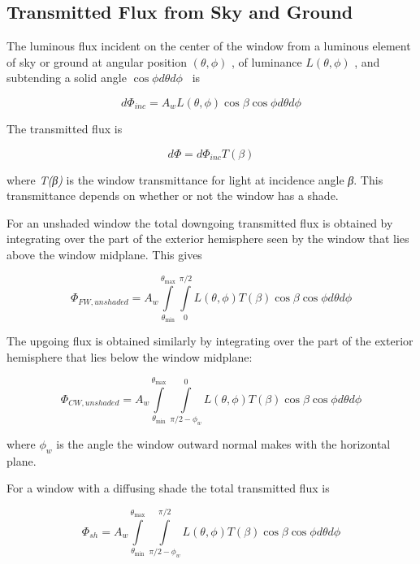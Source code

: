 \subsection{Transmitted Flux from Sky and Ground}\label{transmitted-flux-from-sky-and-ground}

The luminous flux incident on the center of the window from a luminous element of sky or ground at angular position \((\theta ,\phi )\) , of luminance \(L(\theta ,\phi )\) , and subtending a solid angle \(\cos \phi d\theta d\phi\) ~is

\begin{equation}
d{\Phi_{inc}} = {A_w}L(\theta ,\phi )\cos \beta \cos \phi d\theta d\phi
\end{equation}

The transmitted flux is

\begin{equation}
d\Phi  = d{\Phi_{inc}}T(\beta )
\end{equation}

where \emph{T(β)} is the window transmittance for light at incidence angle \emph{β}. This transmittance depends on whether or not the window has a shade.

For an unshaded window the total downgoing transmitted flux is obtained by integrating over the part of the exterior hemisphere seen by the window that lies above the window midplane. This gives

\begin{equation}
{\Phi_{FW,unshaded}} = {A_w}\int\limits_{{\theta_{\min }}}^{{\theta_{\max }}} {\int\limits_0^{\pi /2} {L(\theta ,\phi )T(\beta )\cos \beta \cos \phi d\theta d\phi } }
\end{equation}

The upgoing flux is obtained similarly by integrating over the part of the exterior hemisphere that lies below the window midplane:

\begin{equation}
{\Phi_{CW,unshaded}} = {A_w}\int\limits_{{\theta_{\min }}}^{{\theta_{\max }}} {\int\limits_{\pi /2 - {\phi_w}}^0 {L(\theta ,\phi )T(\beta )\cos \beta \cos \phi d\theta d\phi } }
\end{equation}

where \({\phi_w}\) is the angle the window outward normal makes with the horizontal plane.

For a window with a diffusing shade the total transmitted flux is

\begin{equation}
{\Phi_{sh}} = {A_w}\int\limits_{{\theta_{\min }}}^{{\theta_{\max }}} {\int\limits_{\pi /2 - {\phi_w}}^{\pi /2} {L(\theta ,\phi )T(\beta )\cos \beta \cos \phi d\theta d\phi } }
\end{equation}

